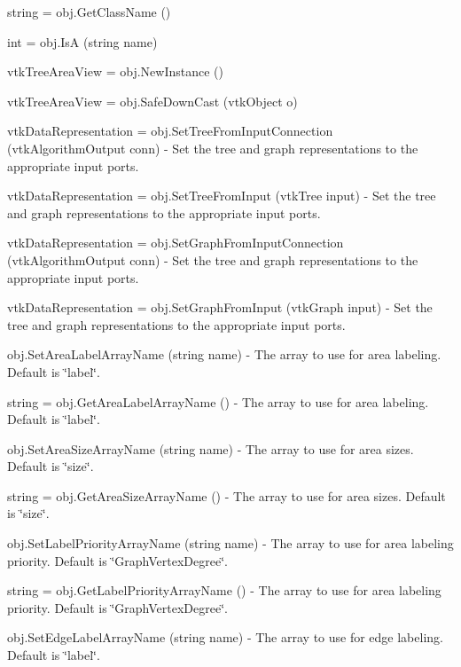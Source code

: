 \begin{DoxyItemize}
\item {\ttfamily string = obj.\-Get\-Class\-Name ()}  
\item {\ttfamily int = obj.\-Is\-A (string name)}  
\item {\ttfamily vtk\-Tree\-Area\-View = obj.\-New\-Instance ()}  
\item {\ttfamily vtk\-Tree\-Area\-View = obj.\-Safe\-Down\-Cast (vtk\-Object o)}  
\item {\ttfamily vtk\-Data\-Representation = obj.\-Set\-Tree\-From\-Input\-Connection (vtk\-Algorithm\-Output conn)} -\/ Set the tree and graph representations to the appropriate input ports.  
\item {\ttfamily vtk\-Data\-Representation = obj.\-Set\-Tree\-From\-Input (vtk\-Tree input)} -\/ Set the tree and graph representations to the appropriate input ports.  
\item {\ttfamily vtk\-Data\-Representation = obj.\-Set\-Graph\-From\-Input\-Connection (vtk\-Algorithm\-Output conn)} -\/ Set the tree and graph representations to the appropriate input ports.  
\item {\ttfamily vtk\-Data\-Representation = obj.\-Set\-Graph\-From\-Input (vtk\-Graph input)} -\/ Set the tree and graph representations to the appropriate input ports.  
\item {\ttfamily obj.\-Set\-Area\-Label\-Array\-Name (string name)} -\/ The array to use for area labeling. Default is \char`\"{}label\char`\"{}.  
\item {\ttfamily string = obj.\-Get\-Area\-Label\-Array\-Name ()} -\/ The array to use for area labeling. Default is \char`\"{}label\char`\"{}.  
\item {\ttfamily obj.\-Set\-Area\-Size\-Array\-Name (string name)} -\/ The array to use for area sizes. Default is \char`\"{}size\char`\"{}.  
\item {\ttfamily string = obj.\-Get\-Area\-Size\-Array\-Name ()} -\/ The array to use for area sizes. Default is \char`\"{}size\char`\"{}.  
\item {\ttfamily obj.\-Set\-Label\-Priority\-Array\-Name (string name)} -\/ The array to use for area labeling priority. Default is \char`\"{}\-Graph\-Vertex\-Degree\char`\"{}.  
\item {\ttfamily string = obj.\-Get\-Label\-Priority\-Array\-Name ()} -\/ The array to use for area labeling priority. Default is \char`\"{}\-Graph\-Vertex\-Degree\char`\"{}.  
\item {\ttfamily obj.\-Set\-Edge\-Label\-Array\-Name (string name)} -\/ The array to use for edge labeling. Default is \char`\"{}label\char`\"{}.  

\end{DoxyItemize}
